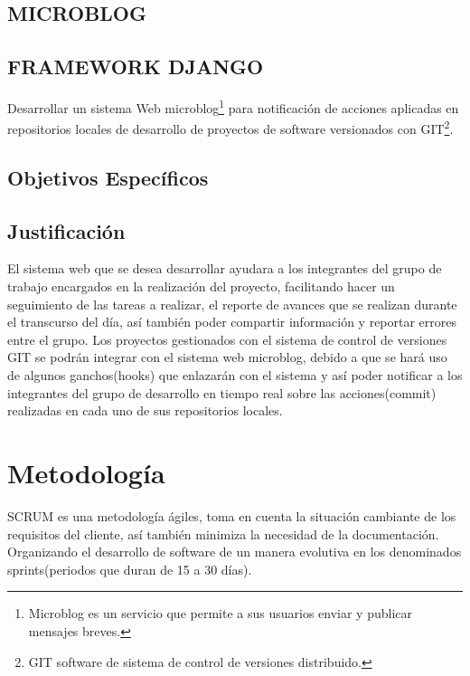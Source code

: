 \subsection{MICROBLOG}

\subsection{FRAMEWORK DJANGO}
Desarrollar un sistema Web microblog\footnote{Microblog es un servicio que permite a sus usuarios enviar y publicar mensajes breves.
} para notificación de acciones aplicadas en repositorios locales de desarrollo de proyectos de software versionados con GIT\footnote{GIT software de sistema de control de versiones distribuido.
}.

\subsection{Objetivos Específicos}

\subsection{Justificación}
El sistema web que se desea desarrollar ayudara  a los integrantes del grupo de trabajo encargados en la realización del proyecto, facilitando hacer un seguimiento de las tareas a realizar, el reporte de avances que se realizan durante el transcurso del día, así también poder compartir información y reportar errores entre el grupo.
Los proyectos gestionados con el sistema de control de versiones GIT se podrán integrar con el sistema web microblog, debido a que se hará uso de algunos ganchos(hooks) que enlazarán con el sistema y así poder notificar a los integrantes del grupo de desarrollo en tiempo real sobre las acciones(commit) realizadas en cada uno de sus repositorios locales.
\section{Metodología}
SCRUM es una metodología ágiles, toma en cuenta la situación cambiante de los requisitos del cliente, así también minimiza la necesidad de la documentación.
Organizando el desarrollo de software de un manera evolutiva en los denominados sprints(periodos que duran de 15 a 30 días).


%
